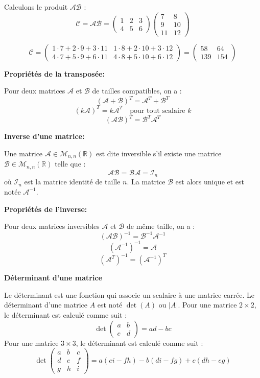 Calculons le produit $\mathcal{A} \mathcal{B}$ :
\[
\mathcal{C} = \mathcal{A} \mathcal{B} = \begin{pmatrix}
1 & 2 & 3 \\
4 & 5 & 6
\end{pmatrix}
\begin{pmatrix}
7 & 8 \\
9 & 10 \\
11 & 12
\end{pmatrix}
\]

\[
\mathcal{C} = \begin{pmatrix}
1 \cdot 7 + 2 \cdot 9 + 3 \cdot 11 & 1 \cdot 8 + 2 \cdot 10 + 3 \cdot 12 \\
4 \cdot 7 + 5 \cdot 9 + 6 \cdot 11 & 4 \cdot 8 + 5 \cdot 10 + 6 \cdot 12
\end{pmatrix}
= \begin{pmatrix}
58 & 64 \\
139 & 154
\end{pmatrix}
\]

\textbf{Propriétés de la transposée:}

Pour deux matrices $\mathcal{A}$ et $\mathcal{B}$ de tailles compatibles, on a :
\[
(\mathcal{A} + \mathcal{B})^T = \mathcal{A}^T + \mathcal{B}^T
\]
\[
(k\mathcal{A})^T = k\mathcal{A}^T \quad \text{pour tout scalaire } k
\]
\[
(\mathcal{A} \mathcal{B})^T = \mathcal{B}^T \mathcal{A}^T
\]

\textbf{Inverse d'une matrice:}

Une matrice $\mathcal{A} \in \mathcal{M}_{n,n}(\mathbb{R})$ est dite inversible s'il existe une matrice $\mathcal{B} \in \mathcal{M}_{n,n}(\mathbb{R})$ telle que :
\[
\mathcal{A} \mathcal{B} = \mathcal{B} \mathcal{A} = \mathcal{I}_n
\]
où $\mathcal{I}_n$ est la matrice identité de taille $n$. La matrice $\mathcal{B}$ est alors unique et est notée $\mathcal{A}^{-1}$.

\textbf{Propriétés de l'inverse:}

Pour deux matrices inversibles $\mathcal{A}$ et $\mathcal{B}$ de même taille, on a :
\[
(\mathcal{A} \mathcal{B})^{-1} = \mathcal{B}^{-1} \mathcal{A}^{-1}
\]
\[
(\mathcal{A}^{-1})^{-1} = \mathcal{A}
\]
\[
(\mathcal{A}^T)^{-1} = (\mathcal{A}^{-1})^T
\]

\textbf{Déterminant d'une matrice}

Le déterminant est une fonction qui associe un scalaire à une matrice carrée. Le déterminant d'une matrice \(A\) est noté \(\det(A)\) ou \(|A|\). Pour une matrice \(2 \times 2\), le déterminant est calculé comme suit :
\[
\det\begin{pmatrix}
a & b \\
c & d
\end{pmatrix} = ad - bc
\]
Pour une matrice \(3 \times 3\), le déterminant est calculé comme suit :
\[
\det\begin{pmatrix}
a & b & c \\
d & e & f \\
g & h & i
\end{pmatrix} = a(ei - fh) - b(di - fg) + c(dh - eg)
\]

